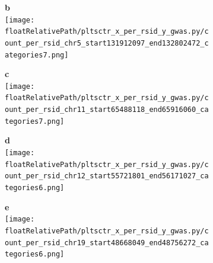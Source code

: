 \begin{figure}[!tbp]

%
\begin{subfigure}[]{.19\textwidth}
\textbf{b}
\\
\texttt{[image: \\floatRelativePath/pltsctr\_x\_per\_rsid\_y\_gwas.py/count\_per\_rsid\_chr5\_start131912097\_end132802472\_categories7.png]}
\end{subfigure}
%
\begin{subfigure}[]{.19\textwidth}
\textbf{c}
\\
\texttt{[image: \\floatRelativePath/pltsctr\_x\_per\_rsid\_y\_gwas.py/count\_per\_rsid\_chr11\_start65488118\_end65916060\_categories7.png]}
\end{subfigure}
%
\begin{subfigure}[]{.19\textwidth}
\textbf{d}
\\
\texttt{[image: \\floatRelativePath/pltsctr\_x\_per\_rsid\_y\_gwas.py/count\_per\_rsid\_chr12\_start55721801\_end56171027\_categories6.png]}
\end{subfigure}
%
\begin{subfigure}[]{.19\textwidth}
\textbf{e}
\\
\texttt{[image: \\floatRelativePath/pltsctr\_x\_per\_rsid\_y\_gwas.py/count\_per\_rsid\_chr19\_start48668049\_end48756272\_categories6.png]}
\end{subfigure}



\end{figure}
